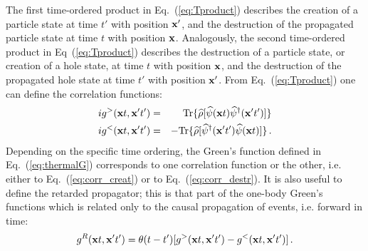 The first time-ordered product in Eq.~(\ref{eq:Tproduct}) describes the creation of a particle state at time $t'$ with position ${\bf x'}$, and the destruction of the propagated particle state at time $t$ with position ${\bf x}$. Analogously, the second time-ordered product in Eq~(\ref{eq:Tproduct}) describes the destruction of a particle state, or creation of a hole state, at time $t$ with position ${\bf x}$, and the destruction of the propagated hole state at time $t'$ with position ${\bf x'}$. From Eq.~(\ref{eq:Tproduct}) one can define the correlation functions: 
\begin{eqnarray}
\label{eq:corr_creat}
ig^>({\bf x}t, {\bf x'}t')&=& ~ ~ {\rm Tr}\{\widehat{\rho}[\widehat\psi({\bf x}t) \widehat\psi^\dagger({\bf x'}t')]\} \\
ig^<({\bf x}t, {\bf x'}t')&=& -{\rm Tr}\{\widehat{\rho}[\widehat\psi^\dagger({\bf x'}t')\widehat\psi({\bf x}t)]\}\,.
\label{eq:corr_destr}
\end{eqnarray}
Depending on the specific time ordering, the Green's function defined in Eq.~(\ref{eq:thermalG}) corresponds to one correlation function or the other, i.e. either to Eq.~(\ref{eq:corr_creat}) or to Eq.~(\ref{eq:corr_destr}). It is also useful to define the retarded propagator; this is that part of the one-body Green's functions which is related only to the causal  propagation of events, i.e. forward in time:
\begin{equation}
\label{eq:retar_prop}
g^R({\bf x}t, {\bf x'}t')=\theta(t-t')[g^>({\bf x}t, {\bf x'}t')-g^<({\bf x}t, {\bf x'}t')]\,.
\end{equation}

